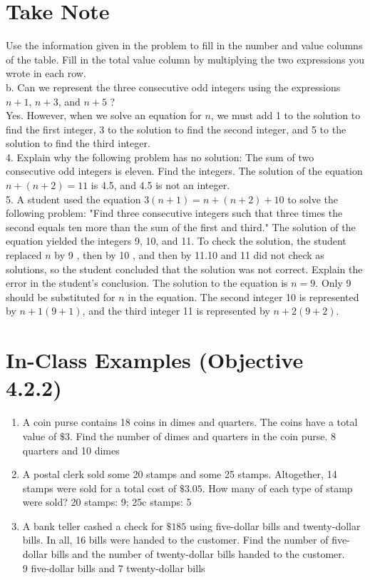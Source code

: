 \documentclass{ximera}
\begin{document}
\section*{Take Note}
Use the information given in the problem to fill in the number and value columns of the table. Fill in the total value column by multiplying the two expressions you wrote in each row.\\
b. Can we represent the three consecutive odd integers using the expressions $n+1$, $n+3$, and $n+5$ ?\\
Yes. However, when we solve an equation for $n$, we must add 1 to the solution to find the first integer, 3 to the solution to find the second integer, and 5 to the solution to find the third integer.\\
4. Explain why the following problem has no solution: The sum of two consecutive odd integers is eleven. Find the integers. The solution of the equation $n+(n+2)=11$ is 4.5, and 4.5 is not an integer.\\
5. A student used the equation $3(n+1)= n+(n+2)+10$ to solve the following problem: "Find three consecutive integers such that three times the second equals ten more than the sum of the first and third." The solution of the equation yielded the integers 9, 10, and 11. To check the solution, the student replaced $n$ by 9 , then by 10 , and then by 11.10 and 11 did not check as solutions, so the student concluded that the solution was not correct. Explain the error in the student's conclusion. The solution to the equation is $n=9$. Only 9 should be substituted for $n$ in the equation. The second integer 10 is represented by $n+1(9+1)$, and the third integer 11 is represented by $n+2(9+2)$.

\section*{In-Class Examples (Objective 4.2.2)}
\begin{enumerate}
  \item A coin purse contains 18 coins in dimes and quarters. The coins have a total value of $\$ 3$. Find the number of dimes and quarters in the coin purse. 8 quarters and 10 dimes
  \item A postal clerk sold some 20\textcent{} stamps and some 25\textcent{} stamps. Altogether, 14 stamps were sold for a total cost of $\$ 3.05$. How many of each type of stamp were sold? 20\textcent{} stamps: 9; 25c stamps: 5
  \item A bank teller cashed a check for $\$ 185$ using five-dollar bills and twenty-dollar bills. In all, 16 bills were handed to the customer. Find the number of five-dollar bills and the number of twenty-dollar bills handed to the customer.\\
9 five-dollar bills and 7 twenty-dollar bills
\end{enumerate}
\end{document}
